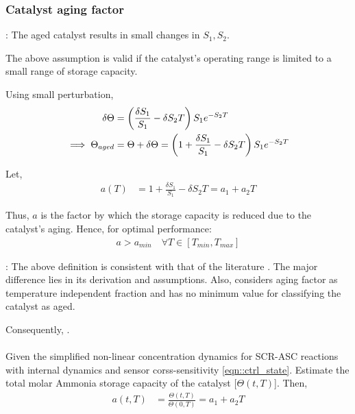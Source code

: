 \subsubsection{Catalyst aging factor}

: The aged catalyst results in small changes in
$S_1, S_2$.

The above assumption is valid if the catalyst's operating range is limited to a
small range of storage capacity.

Using small perturbation,
\begin{align*}
    \delta \Theta &= \left( \frac{\delta S_1}{S_1} - \delta S_2T \right) S_1 e^{-S_2 T}\\
    \implies \Theta_{aged} &= \Theta + \delta \Theta = \left( 1 + \frac{\delta S_1}{S_1} - \delta S_2T \right) S_1 e^{-S_2 T}
\end{align*}

Let,
\begin{align*}
    a(T) &= 1 + \frac{\delta S_1}{S_1} - \delta S_2T = a_1 + a_2 T
\end{align*}

Thus, $a$ is the factor by which the storage capacity is reduced due to the
catalyst's aging. Hence, for optimal performance:
\begin{align*}
    a > a_{min} \quad \forall T \in [T_{min}, T_{max}]
\end{align*}

: The above definition is consistent with that of the literature
\cite{ma2017observer}. The major difference lies in its derivation and
assumptions. Also, \cite{ma2017observer} considers aging factor as temperature
independent fraction and has no minimum value for classifying the catalyst as aged.

Consequently, .\\


\\
Given the simplified non-linear concentration dynamics for SCR-ASC
reactions with internal dynamics and sensor corss-sensitivity
\ref{eqn::ctrl_state}. Estimate the total molar
Ammonia storage capacity of the catalyst [$\Theta(t, T)$]. Then,
\begin{align*}
    a(t, T) &= \frac{\Theta(t, T)}{\Theta(0, T)} = a_1 + a_2 T
\end{align*}


